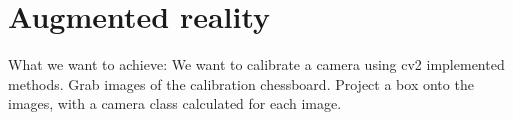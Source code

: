 \section{Augmented reality}

What we want to achieve:
We want to calibrate a camera using cv2 implemented methods.
Grab images of the calibration chessboard.
Project a box onto the images, with a camera class calculated for each
image. 














